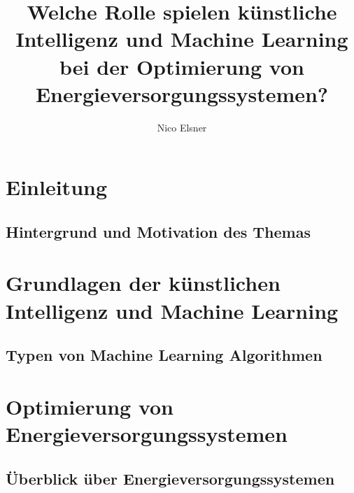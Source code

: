 \documentclass[conference]{IEEEtran}
\title{Welche Rolle spielen künstliche Intelligenz und Machine Learning bei der Optimierung von Energieversorgungssystemen?}
\author{{\Large Nico Elsner}}
\begin{document}

	\maketitle

	\begin{abstract}
		
	\end{abstract}
	\section{Einleitung}
	\subsection{Hintergrund und Motivation des Themas}
	


	\section{Grundlagen der künstlichen Intelligenz und Machine Learning}
	
	\subsection{Typen von Machine Learning Algorithmen}
	

	\section{Optimierung von Energieversorgungssystemen}
	
	\subsection{Überblick über Energieversorgungssystemen}
	
\end{document}
